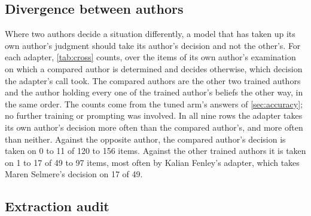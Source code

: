 \begin{table}[t]
\centering\small

\caption{The adapter's wrong answers by the oracle's decision and the option the call took
(options named by what they are, whatever the tool's labels). Pairs with no wrong answer for
any author are omitted; every call named a listed option.}
\label{tab:errors}
\end{table}

\subsection{Divergence between authors}\label{sec:divergence}

Where two authors decide a situation differently, a model that has taken up its own author's
judgment should take its author's decision and not the other's. For each adapter,
\cref{tab:cross} counts, over the items of its own author's examination on which a compared
author is determined and decides otherwise, which decision the adapter's call took. The
compared authors are the other two trained authors and the author holding every one of the
trained author's beliefs the other way, in the same order. The counts come from the tuned
arm's answers of \cref{sec:accuracy}; no further training or prompting was involved. In all
nine rows the adapter takes its own author's decision more often than the compared author's,
and more often than neither. Against the opposite author, the compared author's decision is
taken on 0 to 11 of 120 to 156 items. Against the other trained authors it is taken on 1 to 17
of 49 to 97 items, most often by Kalian Fenley's adapter, which takes Maren Selmere's decision
on 17 of 49.

\begin{table}[t]
\centering\footnotesize
\resizebox{\textwidth}{!}{}
\caption{For each trained adapter, on items of its own author's examination where the
compared author is determined and decides differently from the adapter's own author: how many
of its calls took its own author's decision, the compared author's decision, or neither (the
third option).}
\label{tab:cross}
\end{table}

\subsection{Extraction audit}\label{sec:audit}

